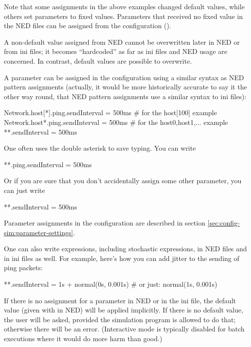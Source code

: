 Note that some assignments in the above examples changed default values,
while others set parameters to fixed values. Parameters that received no
fixed value in the NED files can be assigned from the configuration
().

\begin{important}
    A non-default value assigned from NED cannot be overwritten later in
    NED or from ini files; it becomes ``hardcoded'' as far as ini files
    and NED usage are concerned. In contrast, default values are possible
    to overwrite.
\end{important}

A parameter can be assigned in the configuration using a similar syntax as
NED pattern assignments (actually, it would be more historically accurate
to say it the other way round, that NED pattern assignments use a similar
syntax to ini files):


\begin{inifile}
Network.host[*].ping.sendInterval = 500ms  # for the host[100] example
Network.host*.ping.sendInterval = 500ms    # for the host0,host1,... example
**.sendInterval = 500ms
\end{inifile}

One often uses the double asterisk to save typing. You can write

\begin{inifile}
**.ping.sendInterval = 500ms
\end{inifile}

Or if you are sure that you don't accidentally assign some other
 parameter, you can just write

\begin{inifile}
**.sendInterval = 500ms
\end{inifile}

Parameter assignments in the configuration are described in section
\ref{sec:config-sim:parameter-settings}.

One can also write expressions, including stochastic expressions, in
NED files and in ini files as well. For example, here's how you can
add jitter to the sending of ping packets:

\begin{inifile}
**.sendInterval = 1s + normal(0s, 0.001s)  # or just: normal(1s, 0.001s)
\end{inifile}

If there is no assignment for a parameter in NED or in the ini file, the
default value (given with  in NED) will be applied
implicitly. If there is no default value, the user will be asked, provided
the simulation program is allowed to do that; otherwise there will be an
error. (Interactive mode is typically disabled for batch executions where
it would do more harm than good.)

